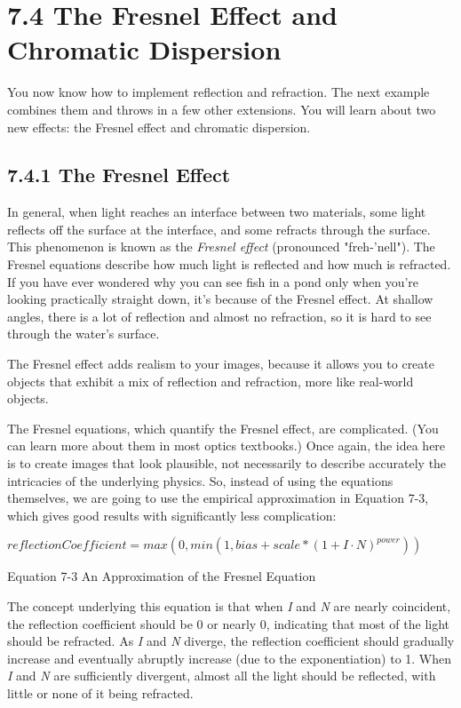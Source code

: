 \documentclass[../main.tex]{subfiles}
\begin{document}
\section{7.4 The Fresnel Effect and Chromatic Dispersion}

You now know how to implement reflection and refraction. The next example combines them and throws in a few other extensions. You will learn about two new effects: the Fresnel effect and chromatic dispersion.

\subsection{7.4.1 The Fresnel Effect}

In general, when light reaches an interface between two materials, some light reflects off the surface at the interface, and some refracts through the surface. This phenomenon is known as the \textit{Fresnel effect} (pronounced "freh-'nell"). The Fresnel equations describe how much light is reflected and how much is refracted. If you have ever wondered why you can see fish in a pond only when you're looking practically straight down, it's because of the Fresnel effect. At shallow angles, there is a lot of reflection and almost no refraction, so it is hard to see through the water's surface.

The Fresnel effect adds realism to your images, because it allows you to create objects that exhibit a mix of reflection and refraction, more like real-world objects.

The Fresnel equations, which quantify the Fresnel effect, are complicated. (You can learn more about them in most optics textbooks.) Once again, the idea here is to create images that look plausible, not necessarily to describe accurately the intricacies of the underlying physics. So, instead of using the equations themselves, we are going to use the empirical approximation in Equation 7-3, which gives good results with significantly less complication:

\FloatBarrier
\begin{equationcaption}
$
reflectionCoefficient = max(0,min(1,bias+scale*(1+I \cdot N)^{power}))
$
\caption{Equation 7-3 An Approximation of the Fresnel Equation}
\end{equationcaption}
\FloatBarrier

The concept underlying this equation is that when \textit{I} and \textit{N} are nearly coincident, the reflection coefficient should be 0 or nearly 0, indicating that most of the light should be refracted. As \textit{I} and \textit{N} diverge, the reflection coefficient should gradually increase and eventually abruptly increase (due to the exponentiation) to 1. When \textit{I} and \textit{N} are sufficiently divergent, almost all the light should be reflected, with little or none of it being refracted.
\end{document}
